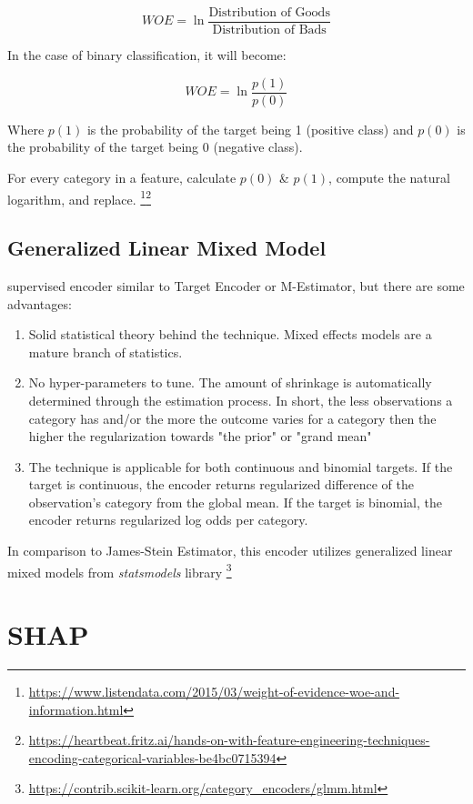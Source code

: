 \documentclass{article}
\begin{document}
\begin{equation}
WOE = \ln{\frac{\text{Distribution of Goods}}{\text{Distribution of Bads}}}
\end{equation}

\noindent In the case of binary classification, it will become:

\begin{equation}
WOE = \ln{\frac{p(1)}{p(0)}}
\end{equation}

\noindent Where $p(1)$ is the probability of the target being 1 (positive class) and $p(0)$ is the probability of the target being 0 (negative class). 

\noindent For every category in a feature, calculate $p(0)$ \& $p(1)$, compute the natural logarithm, and replace. \footnote{\url{https://www.listendata.com/2015/03/weight-of-evidence-woe-and-information.html}}\footnote{\url{https://heartbeat.fritz.ai/hands-on-with-feature-engineering-techniques-encoding-categorical-variables-be4bc0715394}}

\subsection*{Generalized Linear Mixed Model}
supervised encoder similar to Target Encoder or M-Estimator, but there are some advantages:
\begin{enumerate}
\item Solid statistical theory behind the technique. Mixed effects models are a mature branch of statistics.
\item No hyper-parameters to tune. The amount of shrinkage is automatically determined through the estimation process. In short, the less observations a category has and/or the more the outcome varies for a category then the higher the regularization towards "the prior" or "grand mean"
\item The technique is applicable for both continuous and binomial targets. If the target is continuous, the encoder returns regularized difference of the observation’s category from the global mean. If the target is binomial, the encoder returns regularized log odds per category.
\end{enumerate}

In comparison to James-Stein Estimator, this encoder utilizes generalized linear mixed models from \textit{statsmodels} library \footnote{\url{https://contrib.scikit-learn.org/category_encoders/glmm.html}}

\section{SHAP}
\end{document}
